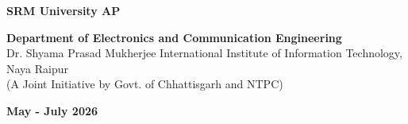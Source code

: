 \begin{titlepage}
\begin{center}
\begin{minipage}{0.45\textwidth}
\textbf{SRM University AP}
\end{minipage}

\vspace{0.8cm}

\textbf{Department of Electronics and Communication Engineering}\\
{\small Dr. Shyama Prasad Mukherjee International Institute of Information Technology, Naya Raipur}\\
{\small (A Joint Initiative by Govt. of Chhattisgarh and NTPC)}

\vspace{0.4cm}

{\large\bfseries May - July 2026}

\end{center}

\end{titlepage}
